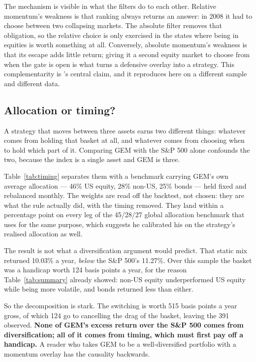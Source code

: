 \documentclass[11pt,a4paper]{article}
\let\oldsubsection\subsection
\renewcommand{\subsection}{\FloatBarrier\oldsubsection}
\begin{document}
The mechanism is visible in what the filters do to each other. Relative
momentum's weakness is that ranking always returns an answer: in 2008 it had to
choose between two collapsing markets. The absolute filter removes that
obligation, so the relative choice is only exercised in the states where being
in equities is worth something at all. Conversely, absolute momentum's weakness
is that its escape adds little return; giving it a second equity market to
choose from when the gate is open is what turns a defensive overlay into a
strategy. This complementarity is \citeauthor{antonacci2016}'s central claim,
and it reproduces here on a different sample and different data.

\subsection{Allocation or timing?}

A strategy that moves between three assets earns two different things: whatever
comes from holding that basket at all, and whatever comes from choosing when to
hold which part of it. Comparing GEM with the S\&P 500 alone confounds the two,
because the index is a single asset and GEM is three.

Table~\ref{tab:timing} separates them with a benchmark carrying GEM's own
average allocation --- 46\% US equity, 28\% non-US, 25\% bonds --- held fixed
and rebalanced monthly. The weights are read off the backtest, not chosen: they
are what the rule actually did, with the timing removed. They land within a
percentage point on every leg of the 45/28/27 global allocation benchmark that
\citet{antonacci2018} uses for the same purpose, which suggests he calibrated
his on the strategy's realised allocation as well.

\begin{table}[!ht]
  \centering
  \caption{Allocation effect versus timing effect.}
  \label{tab:timing}
  
\end{table}

The result is not what a diversification argument would predict. That static
mix returned 10.03\% a year, \emph{below} the S\&P 500's 11.27\%. Over this
sample the basket was a handicap worth 124 basis points a year, for the reason
Table~\ref{tab:summary} already showed: non-US equity underperformed US equity
while being more volatile, and bonds returned less than either.

So the decomposition is stark. The switching is worth 515 basis points a year
gross, of which 124 go to cancelling the drag of the basket, leaving the 391
observed. \textbf{None of GEM's excess return over the S\&P 500 comes from
diversification; all of it comes from timing, which must first pay off a
handicap.} A reader who takes GEM to be a well-diversified portfolio with a
momentum overlay has the causality backwards.
\end{document}
